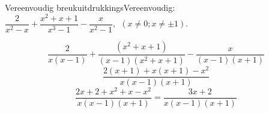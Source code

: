 \begin{wex}{Vereenvoudig breukuitdrukkings}{Vereenvoudig: $\dfrac{2}{{x}^{2}-x}+\dfrac{x^{2}+x+1}{x^{3}-1}-\dfrac{x}{{x}^{2}-1}, ~~(x \neq 0;x \neq \pm1)$.}
{
\begin{equation*}
\dfrac{2}{x(x-1)}+ \dfrac{({x}^{2} + x + 1)}{(x-1)(x^{2}+x+1)}-\dfrac{x}{(x-1)(x+1)}
\end{equation*}
\begin{equation*}
\dfrac{2(x+1)+x(x+1)-x^{2}}{x(x-1)(x+1)}
\end{equation*}
\begin{equation*}
\dfrac{2x+2 + x^{2} + x - x^{2}}{x(x-1)(x+1)} = \dfrac{3x+2}{x(x-1)(x+1)}
\end{equation*}



}
\end{wex}



